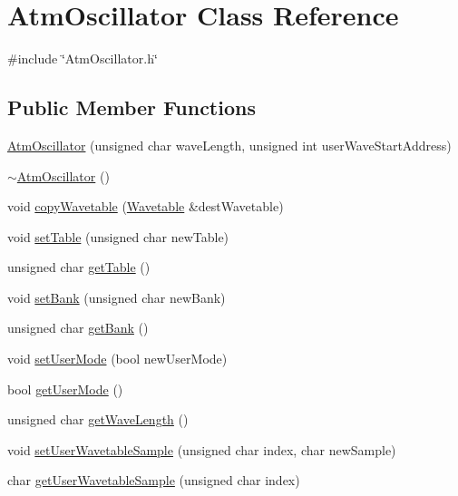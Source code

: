 \hypertarget{class_atm_oscillator}{}\section{Atm\+Oscillator Class Reference}
\label{class_atm_oscillator}


{\ttfamily \#include \char`\"{}Atm\+Oscillator.\+h\char`\"{}}

\subsection*{Public Member Functions}
\begin{DoxyCompactItemize}
\item 
\hyperlink{class_atm_oscillator_a864b35c83864a6d5045f9dbb42fa862e}{Atm\+Oscillator} (unsigned char wave\+Length, unsigned int user\+Wave\+Start\+Address)
\item 
\hyperlink{class_atm_oscillator_a3d5b959eff3a2cb4fa3200cadeb2ab0b}{$\sim$\+Atm\+Oscillator} ()
\item 
void \hyperlink{class_atm_oscillator_ab0b1ab90e227ced30ddffff96bec6427}{copy\+Wavetable} (\hyperlink{class_wavetable}{Wavetable} \&dest\+Wavetable)
\item 
void \hyperlink{class_atm_oscillator_ac4248a3cd6fceea6ee677e74faba4af0}{set\+Table} (unsigned char new\+Table)
\item 
unsigned char \hyperlink{class_atm_oscillator_a01e9856e38a1e83b5d83fd503d5ad80e}{get\+Table} ()
\item 
void \hyperlink{class_atm_oscillator_a9f65ae9f2132c46f73b776a869b5bf21}{set\+Bank} (unsigned char new\+Bank)
\item 
unsigned char \hyperlink{class_atm_oscillator_a56b407e4175f4625e2e0d7a6f87c2225}{get\+Bank} ()
\item 
void \hyperlink{class_atm_oscillator_aafaccbb54d52f2c0eb07eb968498eef4}{set\+User\+Mode} (bool new\+User\+Mode)
\item 
bool \hyperlink{class_atm_oscillator_a21a4425606aa28eabf47a28ea7f02c9a}{get\+User\+Mode} ()
\item 
unsigned char \hyperlink{class_atm_oscillator_ad846116dfd6f232cae79ada35dddadfd}{get\+Wave\+Length} ()
\item 
void \hyperlink{class_atm_oscillator_aa62dba14693f65adcb3daa7aa4757ba1}{set\+User\+Wavetable\+Sample} (unsigned char index, char new\+Sample)
\item 
char \hyperlink{class_atm_oscillator_ae5ef1556ef77dbf9ecceb5b64a1ad7e8}{get\+User\+Wavetable\+Sample} (unsigned char index)

\end{DoxyCompactItemize}
